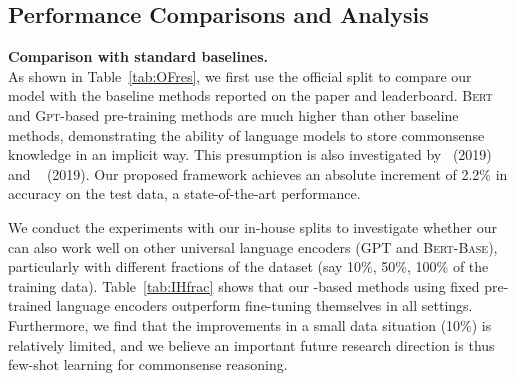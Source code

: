 \documentclass[11pt,a4paper]{article}
\begin{document}
\subsection{Performance Comparisons and Analysis}





\noindent
\textbf{Comparison with standard baselines.} \\
As shown in Table~\ref{tab:OFres}, we first use the official split to compare our model with the baseline methods reported on the paper and leaderboard. 
\textsc{Bert} and \textsc{Gpt}-based pre-training methods are much higher than other baseline methods, demonstrating the ability of language models to store commonsense knowledge in an implicit way.
This presumption is also investigated by~\citeauthor{trinh2019do} (2019) and ~\citeauthor{Wang2019DoesIM} (2019).
Our proposed framework achieves an absolute increment of  2.2\% in accuracy on the test data, a state-of-the-art
performance. 


We conduct the experiments with our in-house splits to investigate whether our \KagNet can also work well on other universal language encoders (\textsc{GPT} and \textsc{Bert-Base}), particularly with different fractions of the dataset (say 10\%, 50\%, 100\% of the training data).
Table~\ref{tab:IHfrac} shows that our \KagNet-based methods using fixed pre-trained language encoders outperform fine-tuning themselves in all settings.
Furthermore, we find that the improvements in a small data situation (10\%) is relatively limited, and we believe an important future research direction is thus few-shot learning for commonsense reasoning.
\end{document}
